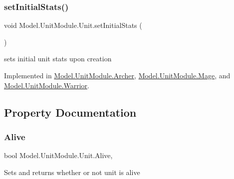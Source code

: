 \hypertarget{interface_model_1_1_unit_module_1_1_unit_a3b67c1b9e929a9f7d4191de20996220a}{}\label{interface_model_1_1_unit_module_1_1_unit_a3b67c1b9e929a9f7d4191de20996220a} 
\subsubsection{\texorpdfstring{set\+Initial\+Stats()}{setInitialStats()}}
{\footnotesize\ttfamily void Model.\+Unit\+Module.\+Unit.\+set\+Initial\+Stats (\begin{DoxyParamCaption}{ }\end{DoxyParamCaption})}

sets initial unit stats upon creation 

Implemented in \hyperlink{class_model_1_1_unit_module_1_1_archer_acd305143313040a061b7482039c7a9b6}{Model.\+Unit\+Module.\+Archer}, \hyperlink{class_model_1_1_unit_module_1_1_mage_a7b16a0324edbd7daa0d54ba5b6bd9735}{Model.\+Unit\+Module.\+Mage}, and \hyperlink{class_model_1_1_unit_module_1_1_warrior_a3a55c013bad5ebd5f6e4402fc8b1f887}{Model.\+Unit\+Module.\+Warrior}.



\subsection{Property Documentation}
\hypertarget{interface_model_1_1_unit_module_1_1_unit_ad86bbb877967345a444213ccde760304}{}\label{interface_model_1_1_unit_module_1_1_unit_ad86bbb877967345a444213ccde760304} 
\subsubsection{\texorpdfstring{Alive}{Alive}}
{\footnotesize\ttfamily bool Model.\+Unit\+Module.\+Unit.\+Alive\hspace{0.3cm}{\ttfamily [get]}, {\ttfamily [set]}}

Sets and returns whether or not unit is alive \hypertarget{interface_model_1_1_unit_module_1_1_unit_ad882bd1108f451dfbfdcfd5fa66a5fcd}{}\label{interface_model_1_1_unit_module_1_1_unit_ad882bd1108f451dfbfdcfd5fa66a5fcd} 
